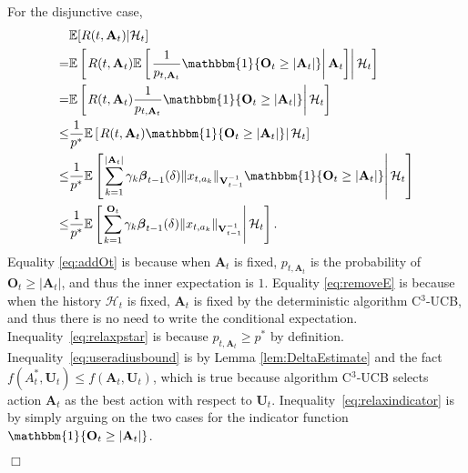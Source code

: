 \documentclass{article}
\newcommand{\bbeta}{\boldsymbol{\beta}}
\newcommand{\EE}{\mathbb{E}}
\newcommand{\bOne}{\mathbbm{1}}
\newcommand{\bA}{\mathbf{A}}
\newcommand{\bO}{\mathbf{O}}
\newcommand{\bU}{\mathbf{U}}
\newcommand{\bV}{\mathbf{V}}
\newcommand{\cH}{\mathcal{H}}
\newcommand{\abs}[1]{\left| #1 \right|}
\newcommand{\norm}[1]{\| #1 \|}
\newenvironment{proof}{\noindent {\textbf{Proof. }}}{$\Box$ \medskip}
\begin{document}
\begin{proof}
For the disjunctive case,  
\begin{align}
&\EE[R(t, \bA_t)|\cH_t]  \nonumber \\
=& \EE \left[ \left. R(t, \bA_t) \EE \left[ \left. \frac{1}{p_{t, \bA_t}} \bOne\{\bO_t\geq\abs{\bA_t}\} \right| \bA_t \right]  \right| \cH_t \right]
	\label{eq:addOt}\\
=& \EE \left[ \left. R(t, \bA_t) \frac{1}{p_{t, \bA_t}} \bOne\{\bO_t\geq\abs{\bA_t}\}  \right| \cH_t \right] \label{eq:removeE}\\
\leq &\frac{1}{p^{\ast}} \EE \left[ \left. R(t, \bA_t) \bOne\{\bO_t\geq\abs{\bA_t}\}  \right| \cH_t \right] \label{eq:relaxpstar}\\
\leq &\frac{1}{p^{\ast}} \EE \left[ \left. \sum_{k=1}^{\abs{\bA_t}} \gamma_k \bbeta_{t-1}(\delta)\norm{x_{t,a_k}}_{\bV_{t-1}^{-1}} \bOne\{\bO_t\geq\abs{\bA_t}\}  \right| \cH_t \right] \label{eq:useradiusbound}\\
\leq &\frac{1}{p^{\ast}} \EE \left[ \left. \sum_{k=1}^{\bO_t} \gamma_k \bbeta_{t-1}(\delta)\norm{x_{t,a_k}}_{\bV_{t-1}^{-1}} \right| \cH_t \right].
\label{eq:relaxindicator}
\end{align}
Equality \eqref{eq:addOt} is because when $\bA_t$ is fixed, $p_{t, \bA_t}$
	is the probability of $\bO_t\geq\abs{\bA_t}$, and thus the inner expectation is $1$.
Equality \eqref{eq:removeE} is because when the history $\cH_t$ is fixed,
	$\bA_t$ is fixed by the deterministic algorithm C$^3$-UCB, and thus there is no
	need to write the conditional expectation.
Inequality~\eqref{eq:relaxpstar} is because $p_{t,\bA_t} \geq p^*$ by definition.
Inequality~\eqref{eq:useradiusbound} is by Lemma \ref{lem:DeltaEstimate} and
	the fact $f(A_t^*, \bU_t) \leq f(\bA_t, \bU_t)$, which is true because
	algorithm C$^3$-UCB selects action $\bA_t$ as the best action with respect to
	$\bU_t$.
Inequality~\eqref{eq:relaxindicator} is by simply arguing on the two cases for
	the indicator function $\bOne\{\bO_t\geq\abs{\bA_t}\}$.


\end{proof}
\end{document}
